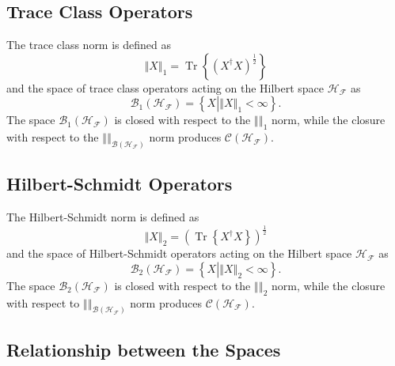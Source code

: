 \documentclass[aps,preprint]{revtex4}%
\begin{document}
\subsection{Trace Class Operators}

The trace class norm is defined as
\begin{equation}
\left\Vert X\right\Vert _{1}=\operatorname*{Tr}\left\{  \left(  X^{\dagger
}X\right)  ^{\frac{1}{2}}\right\}
\end{equation}
and the space of trace class operators acting on the Hilbert space
$\mathcal{H}_{\mathcal{F}}$ as
\begin{equation}
\mathcal{B}_{1}\left(  \mathcal{H}_{\mathcal{F}}\right)  =\left\{  X\left\vert
\left\Vert X\right\Vert _{1}<\infty\right.  \right\}  .
\end{equation}
The space $\mathcal{B}_{1}\left(  \mathcal{H}_{\mathcal{F}}\right)  $ is
closed with respect to the $\left\Vert {}\right\Vert _{1}$ norm, while the
closure with respect to the $\left\Vert {}\right\Vert _{\mathcal{B}\left(
\mathcal{H}_{\mathcal{F}}\right)  }$ norm produces $\mathcal{C}\left(
\mathcal{H}_{\mathcal{F}}\right)  .$

\subsection{Hilbert-Schmidt Operators}

The Hilbert-Schmidt norm is defined as
\begin{equation}
\left\Vert X\right\Vert _{2}=\left(  \operatorname*{Tr}\left\{  X^{\dagger
}X\right\}  \right)  ^{\frac{1}{2}}%
\end{equation}
and the space of Hilbert-Schmidt operators acting on the Hilbert space
$\mathcal{H}_{\mathcal{F}}$ as
\begin{equation}
\mathcal{B}_{2}\left(  \mathcal{H}_{\mathcal{F}}\right)  =\left\{  X\left\vert
\left\Vert X\right\Vert _{2}<\infty\right.  \right\}  .
\end{equation}
The space $\mathcal{B}_{2}\left(  \mathcal{H}_{\mathcal{F}}\right)  $ is
closed with respect to the $\left\Vert {}\right\Vert _{2}$ norm, while the
closure with respect to $\left\Vert {}\right\Vert _{\mathcal{B}\left(
\mathcal{H}_{\mathcal{F}}\right)  }$ norm produces $\mathcal{C}\left(
\mathcal{H}_{\mathcal{F}}\right)  .$

\subsection{Relationship between the Spaces}
\end{document}
